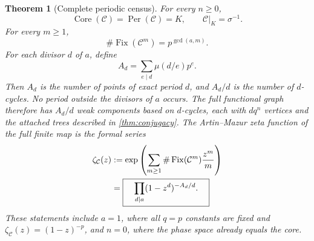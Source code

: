\documentclass[10pt,a4paper]{amsart}
\newtheorem{theorem}{Theorem}[section]
\theoremstyle{definition}
\theoremstyle{remark}
\newcommand{\Fix}{\operatorname{Fix}}
\newcommand{\Per}{\operatorname{Per}}
\newcommand{\Core}{\operatorname{Core}}
\newcommand{\mob}{\mu}
\begin{document}
\begin{theorem}[Complete periodic census]
\label{thm:periodic}
For every $n\ge0$,
\begin{equation}
 \Core(\mathcal C)=\Per(\mathcal C)=K,
 \qquad
 \mathcal C|_K=\sigma^{-1}.
 \label{eq:core}
\end{equation}
For every $m\ge1$,
\begin{equation}
 \boxed{\quad \#\Fix(\mathcal C^m)=p^{\gcd(a,m)}.\quad}
 \label{eq:fixed-count}
\end{equation}
For each divisor $d$ of $a$, define
\begin{equation}
 A_d=\sum_{e\mid d}\mob(d/e)p^e.
 \label{eq:exact-period-points}
\end{equation}
Then $A_d$ is the number of points of exact period $d$, and $A_d/d$ is the
number of $d$-cycles.  No period outside the divisors of $a$ occurs.  The
full functional graph therefore has $A_d/d$ weak components based on
$d$-cycles, each with $dq^n$ vertices and the attached trees described in
\cref{thm:conjugacy}.  The
Artin--Mazur zeta function of the full finite map is the formal series
\begin{align}
 \zeta_{\mathcal C}(z)
 &:=\exp\left(\sum_{m\ge1}
       \#\Fix(\mathcal C^m)\frac{z^m}{m}\right) 
 \notag\\
 &=\boxed{\quad
   \prod_{d\mid a}(1-z^d)^{-A_d/d}.
   \quad}
 \label{eq:zeta}
\end{align}
These statements include $a=1$, where all $q=p$ constants are fixed and
$\zeta_{\mathcal C}(z)=(1-z)^{-p}$, and $n=0$, where the phase space already
equals the core.
\end{theorem}
\end{document}
